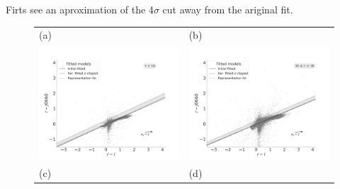 \documentclass[fleqn,usenatbib]{mnras}
\begin{document}
Firts see an aproximation of the  4$\sigma$ cut away from the ariginal fit.

\begin{figure}
  \setlength\tabcolsep{0pt}
  \begin{tabular}{ll}
    (a) & (b) \\
    \includegraphics[trim=10 0 65 20, clip]{Figs/diagram-DR3-errorFlag0-3f-16r}
    & \includegraphics[trim=10 0 65 20, clip]{Figs/diagram-DR3-errorFlag0-3f-16r18}\\
    (c) & (d) \\

\end{tabular}
\end{figure}
\end{document}
